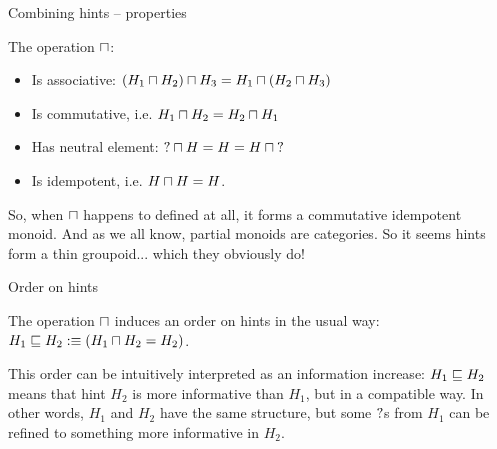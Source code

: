 \documentclass{beamer}
\begin{document}
\begin{frame}{Combining hints -- properties}

The operation $\sqcap$:

\begin{itemize}
  \item Is associative: $(H_1 \sqcap H_2) \sqcap H_3 = H_1 \sqcap (H_2 \sqcap H_3)$
  \item Is commutative, i.e. $H_1 \sqcap H_2 = H_2 \sqcap H_1$
  \item Has neutral element: $\mathbf{?} \sqcap H = H = H \sqcap \mathbf{?}$
  \item Is idempotent, i.e. $H \sqcap H = H$.
\end{itemize}

\vspace{2em}

So, when $\sqcap$ happens to defined at all, it forms a commutative idempotent monoid. And as we all know, partial monoids are categories. So it seems hints form a thin groupoid... which they obviously do!

\end{frame}

\begin{frame}{Order on hints}

The operation $\sqcap$ induces an order on hints in the usual way: $H_1 \sqsubseteq H_2 :\equiv (H_1 \sqcap H_2 = H_2)$.

\vspace{2em}

This order can be intuitively interpreted as an information increase: $H_1 \sqsubseteq H_2$ means that hint $H_2$ is more informative than $H_1$, but in a compatible way. In other words, $H_1$ and $H_2$ have the same structure, but some $\mathbf{?}$s from $H_1$ can be refined to something more informative in $H_2$.

\end{frame}
\end{document}
